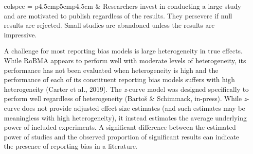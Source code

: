 \documentclass[
  doc, donotrepeattitle,floatsintext]{apa7}
\begin{document}
\begin{longtblr}[
  caption = {The selection and regression models used in our robust Bayesian meta-analysis approach.},
  label = {tab:table1},
]{colspec = {p{4.5cm}p{5cm}p{4.5cm}}}
   &
  Researchers invest in conducting a large study and are motivated to publish regardless of the results. They persevere if null results are rejected. Small studies are abandoned unless the results are impressive. \\
\bottomrule
\end{longtblr}

\clearpage

\normalsize

A challenge for most reporting bias models is large heterogeneity in true effects. While RoBMA appears to perform well with moderate levels of heterogeneity, its performance has not been evaluated when heterogeneity is high and the performance of each of its constituent reporting bias models suffers with high heterogeneity (Carter et al., 2019). The \emph{z}-curve model was designed specifically to perform well regardless of heterogeneity (Bartoš \& Schimmack, in-press). While \emph{z}-curve does not provide adjusted effect size estimates (and such estimates may be meaningless with high heterogeneity), it instead estimates the average underlying power of included experiments. A significant difference between the estimated power of studies and the observed proportion of significant results can indicate the presence of reporting bias in a literature.
\end{document}
